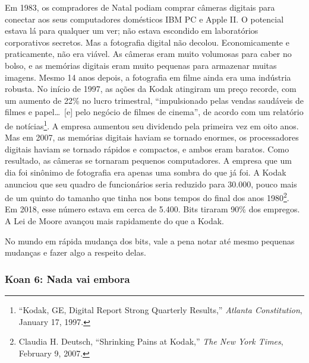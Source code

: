 Em 1983, os compradores de Natal podiam comprar câmeras digitais para conectar 
aos seus computadores domésticos IBM PC e Apple II. O potencial estava lá para 
qualquer um ver; não estava escondido em laboratórios corporativos secretos. Mas 
a fotografia digital não decolou. Economicamente e praticamente, não era viável.
As câmeras eram muito volumosas para caber no bolso, e as memórias digitais eram
muito pequenas para armazenar muitas imagens. Mesmo 14 anos depois, a fotografia
em filme ainda era uma indústria robusta. No início de 1997, as ações da Kodak
atingiram um preço recorde, com um aumento de 22\% no lucro trimestral, 
``impulsionado pelas vendas saudáveis de filmes e papel\ldots\ [e] pelo negócio
de filmes de cinema'', de acordo com um relatório de notícias\footnote{``Kodak,
GE, Digital Report Strong Quarterly Results,'' \textit{Atlanta Constitution},
January 17, 1997.}. A empresa aumentou seu dividendo pela primeira vez em oito
anos. Mas em 2007, as memórias digitais haviam se tornado enormes, os 
processadores digitais haviam se tornado rápidos e compactos, e ambos eram 
baratos. Como resultado, as câmeras se tornaram pequenos computadores. A empresa 
que um dia foi sinônimo de fotografia era apenas uma sombra do que já foi. A 
Kodak anunciou que seu quadro de funcionários seria reduzido para 30.000, pouco 
mais de um quinto do tamanho que tinha nos bons tempos do final dos anos
1980\footnote{Claudia H. Deutsch, ``Shrinking Pains at Kodak,'' \textit{The New
York Times}, February 9, 2007.}. Em 2018, esse número estava em cerca de 5.400.
Bits tiraram 90\% dos empregos. A Lei de Moore avançou mais rapidamente do que a
Kodak.

No mundo em rápida mudança dos bits, vale a pena notar até mesmo pequenas
mudanças e fazer algo a respeito delas.


\subsubsection*{Koan 6: Nada vai embora}


